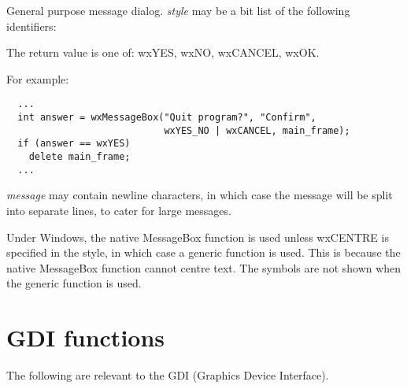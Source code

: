\label{wxmessagebox}


General purpose message dialog.  {\it style} may be a bit list of the
following identifiers:

\begin{twocollist}\itemsep=0pt
\end{twocollist}

The return value is one of: wxYES, wxNO, wxCANCEL, wxOK.

For example:

\begin{verbatim}
  ...
  int answer = wxMessageBox("Quit program?", "Confirm",
                            wxYES_NO | wxCANCEL, main_frame);
  if (answer == wxYES)
    delete main_frame;
  ...
\end{verbatim}

{\it message} may contain newline characters, in which case the
message will be split into separate lines, to cater for large messages.

Under Windows, the native MessageBox function is used unless wxCENTRE
is specified in the style, in which case a generic function is used.
This is because the native MessageBox function cannot centre text.
The symbols are not shown when the generic function is used.

\section{GDI functions}\label{gdifunctions}

The following are relevant to the GDI (Graphics Device Interface).

